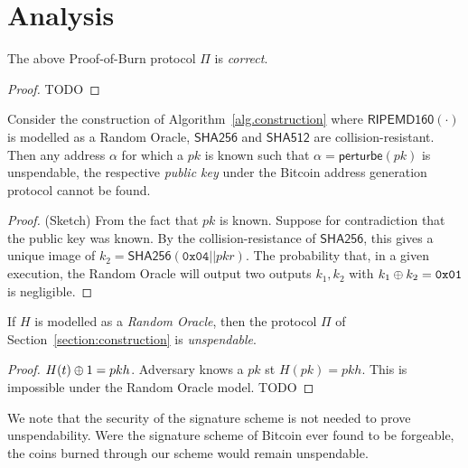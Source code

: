 \section{Analysis}

\begin{theorem}[Correctness]
  The above Proof-of-Burn protocol $\Pi$ is \emph{correct}.
\end{theorem}
\begin{proof}
  TODO
\end{proof}

\begin{theorem}[Unspendability]
  Consider the construction of Algorithm~\ref{alg.construction} where
  $\textsf{RIPEMD160}(\cdot)$ is modelled as a Random Oracle, $\textsf{SHA256}$
  and $\textsf{SHA512}$  are collision-resistant. Then any address $\alpha$ for
  which a $pk$ is known such that $\alpha = \textsf{perturbe}(pk)$ is
  unspendable, the respective \emph{public key} under the Bitcoin address
  generation protocol cannot be found.
\end{theorem}
\begin{proof}(Sketch)
  From the fact that $pk$ is known.
  Suppose for contradiction that the public key was known.
  By the collision-resistance of $\textsf{SHA256}$, this gives a unique image of
  $k_2 = \textsf{SHA256}(\texttt{0x04} || pkr)$.
  The probability that, in a given execution, the Random Oracle will output two
  outputs $k_1, k_2$ with $k_1 \oplus k_2 = \texttt{0x01}$ is negligible.
\end{proof}


\begin{theorem}
  If $H$ is modelled as a \emph{Random Oracle}, then the protocol $\Pi$ of Section~\ref{section:construction} is \emph{unspendable}.
\end{theorem}
\begin{proof}
  $H(t) \oplus 1 = pkh$.
  Adversary knows a $pk$ st $H(pk) = pkh$.
  This is impossible under the Random Oracle model.
  TODO
\end{proof}

We note that the security of the signature scheme is not needed to prove unspendability. Were the signature scheme of Bitcoin ever found to be forgeable, the coins burned through our scheme would remain unspendable.

